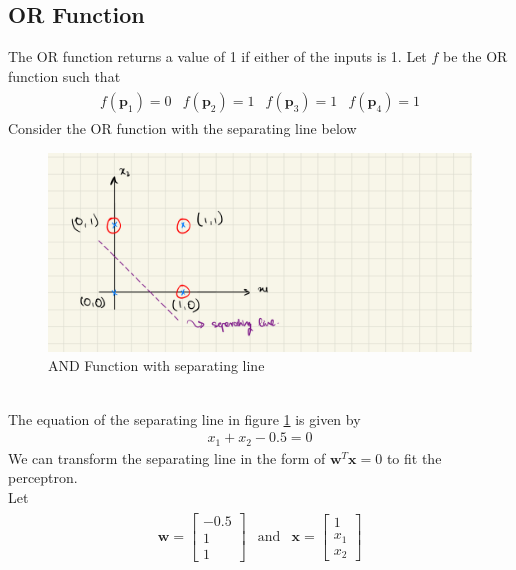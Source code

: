 \subsection{OR Function}
The OR function returns a value of 1 if either of the inputs is 1. Let $f$ be the OR function such that
\begin{align}
\begin{matrix}
  \nonumber
  f(\textbf{p}_1) = 0 & f(\textbf{p}_2) = 1 & f(\textbf{p}_3) = 1 & f(\textbf{p}_4) = 1
\end{matrix}  
\end{align}
Consider the OR function with the separating line below
\begin{figure}[ht]
  \centering
  \includegraphics[scale=0.15]{CHAPTER_2/c2_fig_OR_function.jpeg}
  \caption{AND Function with separating line}
  \label{OR_function}
\end{figure}\\
The equation of the separating line in figure \ref{OR_function} is given by
\begin{align}
  x_1 + x_2 - 0.5 = 0
\end{align}
We can transform the separating line in the form of $\textbf{w}^T\textbf{x} = 0$ to fit the perceptron.\\
Let 
\begin{align}
  \begin{matrix}
    \textbf{w} = \begin{bmatrix}
      -0.5 \\
      1 \\
      1
    \end{bmatrix} & \text{and} & \textbf{x} = \begin{bmatrix}
      1 \\
      x_1 \\
      x_2
    \end{bmatrix}
  \end{matrix}
\end{align}
